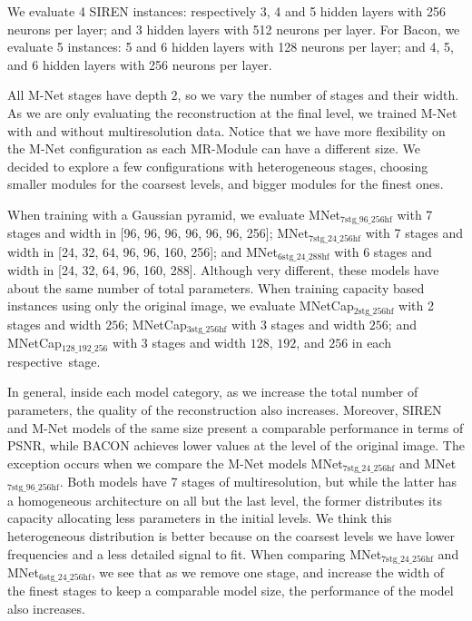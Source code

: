 We evaluate 4 SIREN instances: respectively 3, 4 and 5 hidden layers with 256 neurons per layer; and 3 hidden layers with 512 neurons per layer. For Bacon, we evaluate 5 instances: 5 and 6 hidden layers with 128 neurons per layer; and 4, 5, and 6 hidden layers with 256 neurons per layer. 

All M-Net stages have depth $2$, so we vary the number of stages and their width. As we are only evaluating the  reconstruction at the final level, we trained M-Net with and without multiresolution data. Notice that we have more flexibility on the M-Net configuration as each MR-Module can have a different size. We decided to explore a few configurations with heterogeneous stages, choosing smaller modules for the coarsest levels, and bigger modules for the finest ones.

When training with a Gaussian pyramid, we evaluate MNet$_\text{7stg\_96\_256hf}$ with 7 stages and width in [96, 96, 96, 96, 96, 96, 256]; MNet$_\text{7stg\_24\_256hf}$ with 7 stages and width in [24, 32, 64, 96, 96, 160, 256]; and MNet$_\text{6stg\_24\_288hf}$ with 6 stages and width in [24, 32, 64, 96, 160, 288]. Although very different, these models have about the same number of total parameters. When training capacity based instances using only the original image, we evaluate MNetCap$_\text{2stg\_256hf}$  with 2 stages and width $256$; MNetCap$_\text{3stg\_256hf}$ with 3 stages and width $256$; and MNetCap$_\text{128\_192\_256}$ with 3 stages and width $128$, $192$, and $256$ in each respective~stage.

In general, inside each model category, as we increase the total number of parameters, the quality of the reconstruction also increases. Moreover, SIREN and M-Net models of the same size present a comparable performance in terms of PSNR, while BACON achieves lower values at the level of the original image. The exception occurs when we compare the M-Net models MNet$_\text{7stg\_24\_256hf}$ and MNet$_\text{7stg\_96\_256hf}$. Both models have 7 stages of multiresolution, but while the latter has a homogeneous architecture on all but the last level, the former distributes its capacity allocating less parameters in the initial levels. We think this heterogeneous distribution is better because on the coarsest levels we have lower frequencies and a less detailed signal to fit. When comparing MNet$_\text{7stg\_24\_256hf}$ and MNet$_\text{6stg\_24\_256hf}$, we see that as we remove one stage, and increase the width of the finest stages to keep a comparable model size, the performance of the model also increases. 

